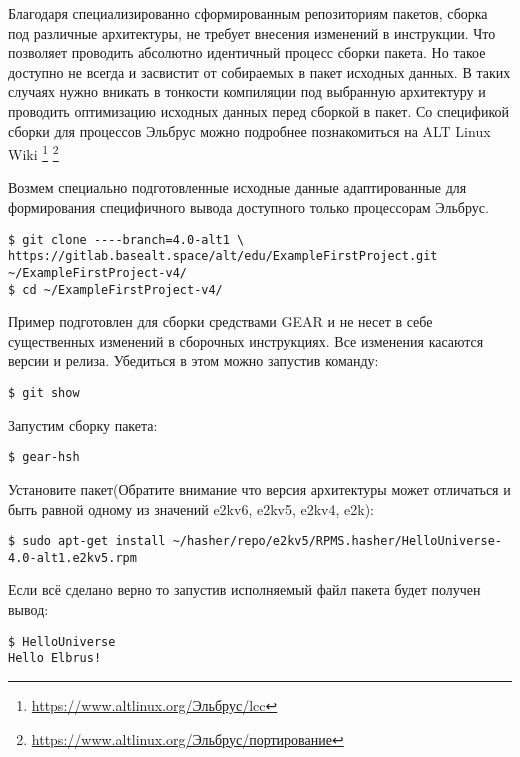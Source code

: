 Благодаря специализированно сформированным репозиториям пакетов, сборка
под различные архитектуры, не требует внесения изменений в инструкции.
Что позволяет проводить абсолютно идентичный процесс сборки пакета.
Но такое доступно не всегда и засвистит от собираемых в пакет исходных данных.
В таких случаях нужно вникать в тонкости компиляции под выбранную архитектуру
и проводить оптимизацию исходных данных перед сборкой в пакет.
Со спецификой сборки для процессов Эльбрус можно подробнее познакомиться
на ALT Linux Wiki%
\footnote{\href{https://www.altlinux.org/\%D0\%AD\%D0\%BB\%D1\%8C\%D0\%B1\%D1\%80\%D1\%83\%D1\%81/lcc}{https://www.altlinux.org/Эльбрус/lcc}}%
\footnote{\href{https://www.altlinux.org/\%D0\%AD\%D0\%BB\%D1\%8C\%D0\%B1\%D1\%80\%D1\%83\%D1\%81/\%D0\%BF\%D0\%BE\%D1\%80\%D1\%82\%D0\%B8\%D1\%80\%D0\%BE\%D0\%B2\%D0\%B0\%D0\%BD\%D0\%B8\%D0\%B5}{https://www.altlinux.org/Эльбрус/портирование}}

Возмем специально подготовленные исходные данные адаптированные для
формирования специфичного вывода доступного только процессорам Эльбрус.

\begin{verbatim}
$ git clone ----branch=4.0-alt1 \
https://gitlab.basealt.space/alt/edu/ExampleFirstProject.git ~/ExampleFirstProject-v4/
$ cd ~/ExampleFirstProject-v4/
\end{verbatim}

Пример подготовлен для сборки средствами GEAR и не несет в себе существенных
изменений в сборочных инструкциях. Все изменения касаются версии и релиза.
Убедиться в этом можно запустив команду:
\begin{verbatim}
$ git show
\end{verbatim}

Запустим сборку пакета:
\begin{verbatim}
$ gear-hsh
\end{verbatim}

Установите пакет(Обратите внимание что версия архитектуры может отличаться и быть равной одному из значений e2kv6, e2kv5, e2kv4, e2k):
\begin{verbatim}
$ sudo apt-get install ~/hasher/repo/e2kv5/RPMS.hasher/HelloUniverse-4.0-alt1.e2kv5.rpm
\end{verbatim}

Если всё сделано верно то запустив исполняемый файл пакета будет получен вывод:
\begin{verbatim}
$ HelloUniverse
Hello Elbrus!

\end{verbatim}

